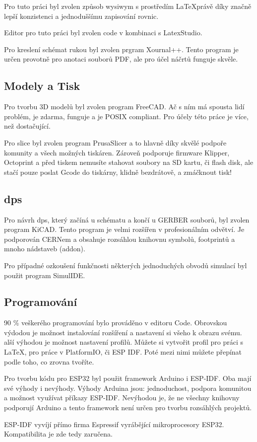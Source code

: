 Pro tuto práci byl zvolen způsob \ac{wysiwym} s prostředím \LaTeX právě díky značně lepší konzistenci a jednoduššímu zapisování rovnic.

Editor pro tuto práci byl zvolen \ac{code} v kombinaci s LatexStudio.

Pro kreslení schémat rukou byl zvolen prgram Xournal++. Tento program je určen provotně pro anotaci souborů PDF, ale pro účel náčrtů funguje skvěle.

\subsection{Modely a Tisk}

Pro tvorbu 3D modelů byl zvolen program FreeCAD. Ač s ním má spousta lidí problém, je zdarma, funguje a je POSIX compliant. Pro účely této práce je více, než dostačující.

Pro \ac{slice} byl zvolen program PrusaSlicer a to hlavně díky skvělé podpoře komunity a všech možných tiskáren. Zároveň podporuje firmware Klipper, Octoprint a před tiskem nemusíte stahovat soubory na SD kartu, či flash disk, ale stačí pouze poslat Gcode do tiskárny, klidně bezdrátově, a zmáčknout tisk!
\subsection{\acs{dps}}

Pro návrh \ac{dps}, který začíná u schématu a končí u GERBER souborů, byl zvolen program KiCAD. Tento program je velmi rozšířen v profesionálním odvětví. Je podporován CERNem a obsahuje rozsáhlou knihovnu symbolů, footprintů a mnoho nádstaveb (addon).

Pro případné ozkoušení funkčnosti některých jednoduchých obvodů simulací byl použit program SimulIDE.

\subsection{Programování}

90 \% veškerého programování bylo prováděno v editoru \ac{Code}.
Obrovskou výdodou je možnost instalování rozšíření a nastavení si všeho k obrazu svému. 
alší výhodou je možnost nastavení profilů. Můžete si vytvořit profil pro práci s \LaTeX, pro práce v PlatformIO, či ESP IDF.
Poté mezi nimi můžete přepínat podle toho, co zrovna tvoříte.

Pro tvorbu kódu pro \ac{ESP32} byl použit framework Arduino i ESP-IDF. Oba mají své výhody i nevýhody. Výhody Arduina jsou: jednoduchost, podpora komunitou a možnost využívat příkazy ESP-IDF. Nevýhodou je, že ne všechny knihovny podporují Arduino a tento framework není určen pro tvorbu rozsáhlých projektů.

ESP-IDF vyvíjí přímo firma Espressif vyrábějící mikroprocesory ESP32. Kompatibilita je zde tedy zaručena.